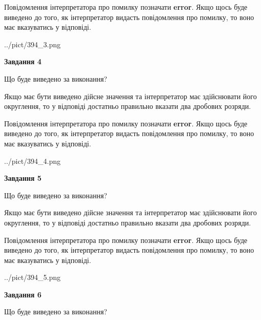 \documentclass[12pt, ukrainian]{article}
\begin{document}
{\begin {Large}
Повідомлення інтерпретатора про помилку позначати \textbf{error}.
Якщо щось буде виведено до того, як інтерпретатор видасть повідомлення про помилку, 
то воно має вказуватись у відповіді. \par

\begin{center}
	{../pict/394_3.png}
\end{center}
\newpage

{\begin {center}\textbf{Завдання 4}\end {center}}\par
Що буде виведено за виконання? \par

Якщо має бути виведено дійсне значення та інтерпретатор має здійснювати його округлення, 
то у відповіді достатньо правильно вказати два дробових розряди.

Повідомлення інтерпретатора про помилку позначати \textbf{error}.
Якщо щось буде виведено до того, як інтерпретатор видасть повідомлення про помилку, 
то воно має вказуватись у відповіді. \par

\begin{center}
	{../pict/394_4.png}
\end{center}
\newpage

{\begin {center}\textbf{Завдання 5}\end {center}}\par
Що буде виведено за виконання? \par

Якщо має бути виведено дійсне значення та інтерпретатор має здійснювати його округлення, 
то у відповіді достатньо правильно вказати два дробових розряди.

Повідомлення інтерпретатора про помилку позначати \textbf{error}.
Якщо щось буде виведено до того, як інтерпретатор видасть повідомлення про помилку, 
то воно має вказуватись у відповіді. \par

\begin{center}
	{../pict/394_5.png}
\end{center}
\newpage

{\begin {center}\textbf{Завдання 6}\end {center}}\par
Що буде виведено за виконання? \par


\end{Large}}
\end{document}

